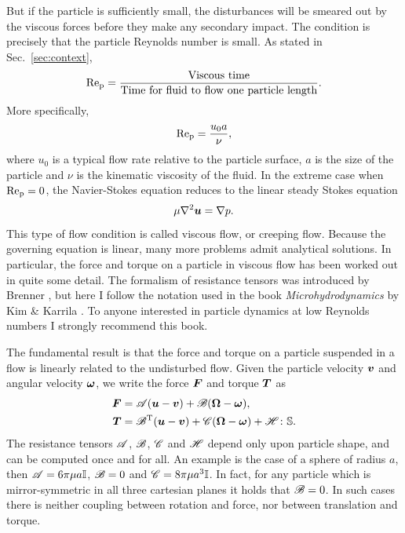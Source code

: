 \documentclass[thesis.tex]{subfiles}
\begin{document}
But if the particle is sufficiently small, the disturbances will be smeared out by the viscous forces before they make any secondary impact. The condition is precisely that the particle Reynolds number is small. As stated in Sec.~\ref{sec:context},
\begin{align*}
 	\mbox{Re}_{\mathrm p} = \frac{\textrm{Viscous time}}{\textrm{Time for fluid to flow one particle length}}.
\end{align*}
More specifically,
\begin{align*}
	\mbox{Re}_{\mathrm p} = \frac{u_0 a}{\nu},
\end{align*}
where $u_0$ is a typical flow rate relative to the particle surface, $a$ is the size of the particle and $\nu$ is the kinematic viscosity of the fluid. In the extreme case when $\mbox{Re}_{\mathrm p}=0$, the Navier-Stokes equation  reduces to the linear steady Stokes equation
\begin{align*}
	\mu \nabla^2 \mbox{\boldmath$u$} = \nabla p.
\end{align*}
This type of flow condition is called viscous flow, or creeping flow. Because the governing equation is linear, many more problems admit analytical solutions. In particular, the force and torque on a particle in viscous flow has been worked out in quite some detail. The formalism of resistance tensors was introduced by Brenner \cite{brenner1974, happel1965}, but here I follow the notation used in the book \emph{Microhydrodynamics} by Kim \& Karrila \cite{kim1991}. To anyone interested in particle dynamics at low Reynolds numbers I strongly recommend this book.

The fundamental result is that the force and torque on a particle suspended in a flow is linearly related to the undisturbed flow. Given the particle velocity $\mbox{\boldmath$v$}$ and angular velocity $\mbox{\boldmath$\omega$}$, we write the force $\mbox{\boldmath$F$}$ and torque $\mbox{\boldmath$T$}$ as
\begin{align}
	\ve F &= \te A (\ve u - \ve v) + \te B (\ve \Omega - \ve \omega), \nn \\
	\ve T &= \te B\transpose (\ve u - \ve v) + \te C (\ve \Omega - \ve \omega) + \te H \dd \ma S. \eqnlab{resistanceformulation}
\end{align}
The resistance tensors $\mathscr{A}$, $\mathscr{B}$, $\mathscr{C}$ and $\mathscr{H}$ depend only upon particle shape, and can be computed once and for all. An example is the case of a sphere of radius $a$, then  $\mathscr{A} = 6\pi\mu a \mathbb{I}$, $\mathscr{B} = 0$ and $\mathscr{C} = 8\pi\mu a^3 \mathbb{I}$. In fact, for any particle which is mirror-symmetric in all three cartesian planes it holds that $\mathscr{B} = 0$. In such cases there is neither coupling between rotation and force, nor between translation and torque. 
\end{document}
